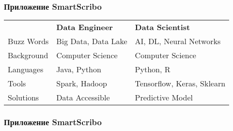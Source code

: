 \begin{frame}[plain]{}
    
    \frametitle{Приложение SmartScribo}
    \begin{tabular}{l|ll}
                & \textbf{Data Engineer} & \textbf{Data Scientist} \\
    Buzz Words  & Big Data, Data Lake    & AI, DL, Neural Networks \\
    Background  & Computer Science       & Computer Science        \\
    Languages   & Java, Python           & Python, R               \\
    Tools       & Spark, Hadoop          & Tensorflow, Keras, Sklearn \\
    Solutions   & Data Accessible        & Predictive Model        \\
    \end{tabular}
\end{frame}


\frametitle{Приложение SmartScribo}
